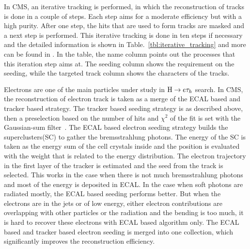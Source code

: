 In CMS, an iterative tracking is performed, in which the reconstruction of tracks is done in a couple of steps. Each step aims for a moderate efficiency but with a high purity. After one step, the hits that are used to form tracks are masked and a next step is performed. This iterative tracking is done in ten steps if necessary and the detailed information is shown in Table.~\ref{tbl:iterative_tracking} and more can be found in \cite{CMS-PRF-14-001}. In the table, the name column points out the processes that this iteration step aims at. The seeding column shows the requirement on the seeding, while the targeted track column shows the characters of the tracks.

Electrons are one of the main particles under study in $\mathrm{H} \to e \tau_{h}$ search. In CMS, the reconstruction of electron track is taken as a merge of the ECAL based and tracker based strategy. The tracker based seeding strategy is as described above, then a preselection based on the number of hits and $\chi^{2}$ of the fit is set with the Gaussian-sum filter~\cite{Algo:GSF}. The ECAL based electron seeding strategy builds the superclusters(SC) to gather the bremsstrahlung photons. The energy of the SC is taken as the energy sum of the cell crystals inside and the position is evaluated with the weight that is related to the energy distribution. The electron trajectory in the first layer of the tracker is estimated and the seed from the track is selected. This works in the case when there is not much bremsstrahlung photons and most of the energy is deposited in ECAL. In the case when soft photons are radiated mostly, the ECAL based seeding performs better. But when the electrons are in the jets or of low energy, either electron contributions are overlapping with other particles or the radiation and the bending is too much, it is hard to recover these electrons with ECAL based algorithm only. The ECAL based and tracker based electron seeding is merged into one collection, which significantly improves the reconstruction efficiency.



